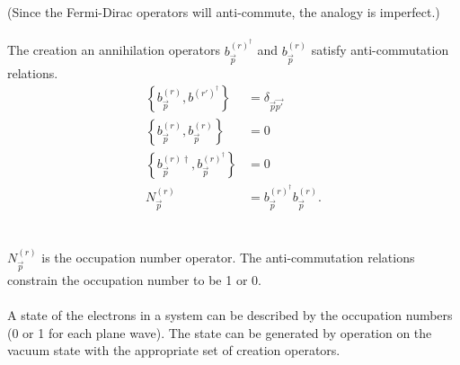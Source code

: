 \documentclass{report}
\begin{document}
\\
\\
(Since the Fermi-Dirac operators will anti-commute, the analogy is imperfect.)
\\
\\
The creation an annihilation operators $\displaystyle b^{(r)^{\dagger}}_{\vec{p}}$ and $\displaystyle b^{(r)}_{\vec{p}}$ satisfy anti-commutation relations.
\begin{align*}
	\left\{ b^{(r)}_{\vec{p}}, b^{\left( r' \right)^{\dagger}} \right\}    & = \delta_{\vec{p} \vec{p'}}                     \\
	\left\{ b^{(r)}_{\vec{p}}, b^{(r)}_{\vec{p}} \right\}                  & = 0                                             \\
	\left\{ b^{(r)\dagger}_{\vec{p}}, b^{(r)^{\dagger}}_{\vec{p}} \right\} & = 0                                             \\
	N^{(r)}_{\vec{p}}                                                      & = b^{(r)^{\dagger}}_{\vec{p}} b^{(r)}_{\vec{p}}
	.\end{align*}
\\
\\
$\displaystyle N^{(r)}_{\vec{p}}$ is the occupation number operator. The anti-commutation relations constrain the occupation number to be 1 or 0.
\\
\\
A state of the electrons in a system can be described by the occupation numbers (0 or 1 for each plane wave). The state can be generated by operation on the vacuum state with the appropriate set of creation operators.
\end{document}
